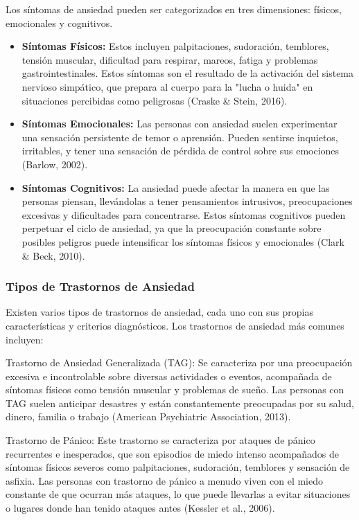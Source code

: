 Los síntomas de ansiedad pueden ser categorizados en tres dimensiones: físicos, emocionales y cognitivos.
\begin{itemize}
	\item \textbf{Síntomas Físicos:} Estos incluyen palpitaciones, sudoración, temblores, tensión muscular, dificultad para respirar, mareos, fatiga y problemas gastrointestinales. Estos síntomas son el resultado de la activación del sistema nervioso simpático, que prepara al cuerpo para la "lucha o huida" en situaciones percibidas como peligrosas (Craske \& Stein, 2016).
	\item \textbf{Síntomas Emocionales:} Las personas con ansiedad suelen experimentar una sensación persistente de temor o aprensión. Pueden sentirse inquietos, irritables, y tener una sensación de pérdida de control sobre sus emociones (Barlow, 2002).
	\item \textbf{Síntomas Cognitivos:} La ansiedad puede afectar la manera en que las personas piensan, llevándolas a tener pensamientos intrusivos, preocupaciones excesivas y dificultades para concentrarse. Estos síntomas cognitivos pueden perpetuar el ciclo de ansiedad, ya que la preocupación constante sobre posibles peligros puede intensificar los síntomas físicos y emocionales (Clark \& Beck, 2010).
\end{itemize}

\subsubsection{Tipos de Trastornos de Ansiedad}
Existen varios tipos de trastornos de ansiedad, cada uno con sus propias características y criterios diagnósticos. Los trastornos de ansiedad más comunes incluyen:

Trastorno de Ansiedad Generalizada (TAG): Se caracteriza por una preocupación excesiva e incontrolable sobre diversas actividades o eventos, acompañada de síntomas físicos como tensión muscular y problemas de sueño. Las personas con TAG suelen anticipar desastres y están constantemente preocupadas por su salud, dinero, familia o trabajo (American Psychiatric Association, 2013).

Trastorno de Pánico: Este trastorno se caracteriza por ataques de pánico recurrentes e inesperados, que son episodios de miedo intenso acompañados de síntomas físicos severos como palpitaciones, sudoración, temblores y sensación de asfixia. Las personas con trastorno de pánico a menudo viven con el miedo constante de que ocurran más ataques, lo que puede llevarlas a evitar situaciones o lugares donde han tenido ataques antes (Kessler et al., 2006).

